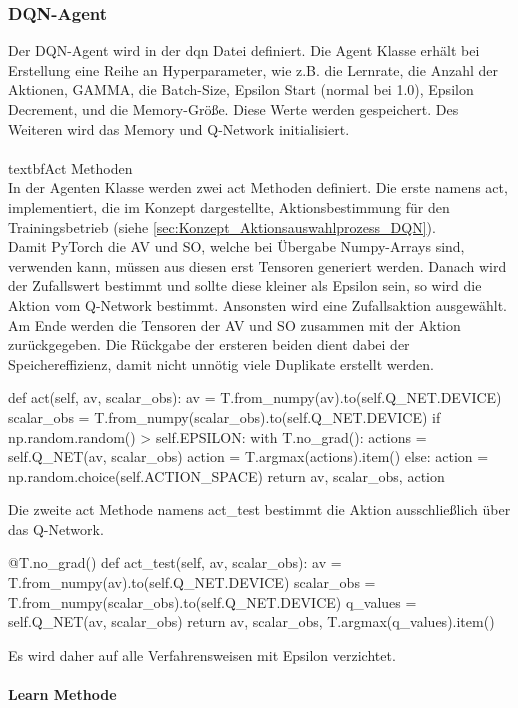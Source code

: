 \subsubsection{DQN-Agent}
Der DQN-Agent wird in der dqn Datei definiert. Die Agent Klasse erhält bei Erstellung eine Reihe an Hyperparameter, wie z.B. die Lernrate, die Anzahl der Aktionen, GAMMA, die Batch-Size, Epsilon Start (normal bei 1.0), Epsilon Decrement, und die Memory-Größe. Diese Werte werden gespeichert. Des Weiteren wird das Memory und Q-Network initialisiert.\\
\\textbf{Act Methoden}
\\In der Agenten Klasse werden zwei act Methoden definiert. Die erste namens act, implementiert, die im Konzept dargestellte, Aktionsbestimmung für den Trainingsbetrieb (siehe \ref{sec:Konzept_Aktionsauswahlprozess_DQN}).\\
Damit PyTorch die AV und SO, welche bei Übergabe Numpy-Arrays sind, verwenden kann, müssen aus diesen erst Tensoren generiert werden. Danach wird der Zufallswert bestimmt und sollte diese kleiner als Epsilon sein, so wird die Aktion vom Q-Network bestimmt. Ansonsten wird eine Zufallsaktion ausgewählt. Am Ende werden die Tensoren der AV und SO zusammen mit der Aktion zurückgegeben. Die Rückgabe der ersteren beiden dient dabei der Speichereffizienz, damit nicht unnötig viele Duplikate erstellt werden.\\
\begin{python}
	def act(self, av, scalar_obs):
		av = T.from_numpy(av).to(self.Q_NET.DEVICE)
		scalar_obs = T.from_numpy(scalar_obs).to(self.Q_NET.DEVICE)
		if np.random.random() > self.EPSILON:
			with T.no_grad():
				actions = self.Q_NET(av, scalar_obs)
				action = T.argmax(actions).item()
		else:
			action = np.random.choice(self.ACTION_SPACE)
		return av, scalar_obs, action
\end{python}
Die zweite act Methode namens act\_test bestimmt die Aktion ausschließlich über das Q-Network. 
\begin{python}
	@T.no_grad()
	def act_test(self, av, scalar_obs):
		av = T.from_numpy(av).to(self.Q_NET.DEVICE)
		scalar_obs = T.from_numpy(scalar_obs).to(self.Q_NET.DEVICE)
		q_values = self.Q_NET(av, scalar_obs)
		return av, scalar_obs, T.argmax(q_values).item()
\end{python}
Es wird daher auf alle Verfahrensweisen mit Epsilon verzichtet.\\
\\\textbf{Learn Methode}\\
